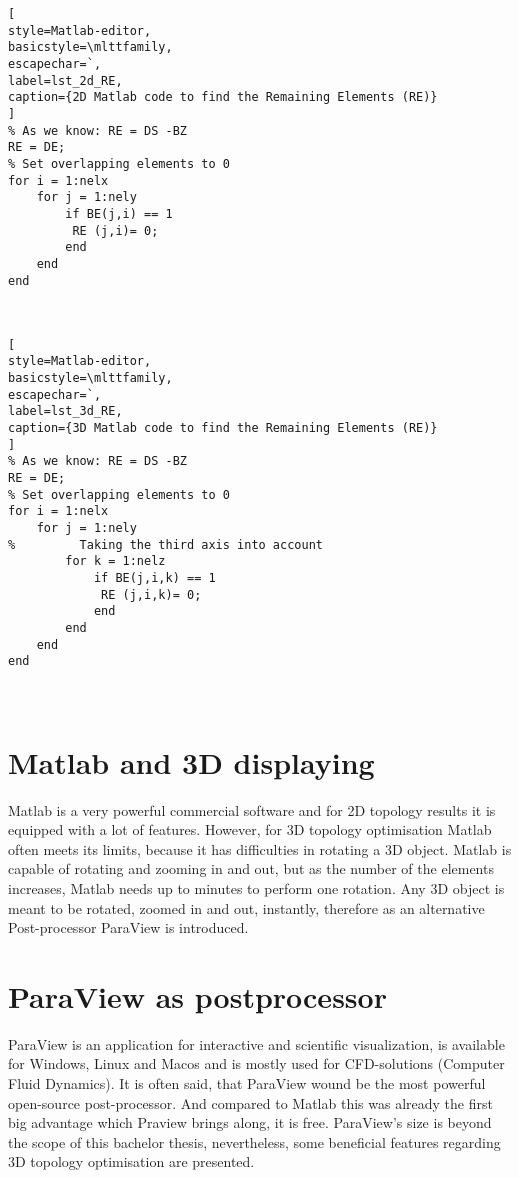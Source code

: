 %

\begin{lstlisting}[
style=Matlab-editor,
basicstyle=\mlttfamily,
escapechar=`,
label=lst_2d_RE,
caption={2D Matlab code to find the Remaining Elements (RE)}
]
% As we know: RE = DS -BZ
RE = DE;
% Set overlapping elements to 0
for i = 1:nelx
    for j = 1:nely
        if BE(j,i) == 1
         RE (j,i)= 0; 
        end
    end
end
\end{lstlisting}~\\
\begin{lstlisting}[
style=Matlab-editor,
basicstyle=\mlttfamily,
escapechar=`,
label=lst_3d_RE,
caption={3D Matlab code to find the Remaining Elements (RE)}
]
% As we know: RE = DS -BZ
RE = DE;
% Set overlapping elements to 0
for i = 1:nelx
    for j = 1:nely
%         Taking the third axis into account
        for k = 1:nelz
            if BE(j,i,k) == 1
             RE (j,i,k)= 0; 
            end
        end
    end
end
\end{lstlisting} ~\\



\section{Matlab and 3D displaying}
\label{section_paraview}
Matlab is a very powerful commercial software and for 2D topology results it is equipped with a lot of features. However, for 3D topology optimisation Matlab often meets its limits, because
it has difficulties in rotating a 3D object.
Matlab is capable of rotating and zooming in and out, but
as the number of the elements increases, Matlab needs
up to minutes to perform one rotation. Any 3D object is meant to be rotated, zoomed in and out, instantly, therefore as an alternative Post-processor ParaView is introduced.

\section{ParaView as postprocessor}   
ParaView is an application for interactive and scientific visualization, is available for Windows, Linux and Macos and is mostly used for CFD-solutions (Computer Fluid Dynamics). It is often said, that ParaView wound be the most powerful open-source post-processor. And compared to Matlab this was already the first big advantage which Praview brings along, it is free. ParaView's size is beyond the scope of this bachelor thesis, nevertheless,
some beneficial features regarding 3D topology optimisation are presented.

